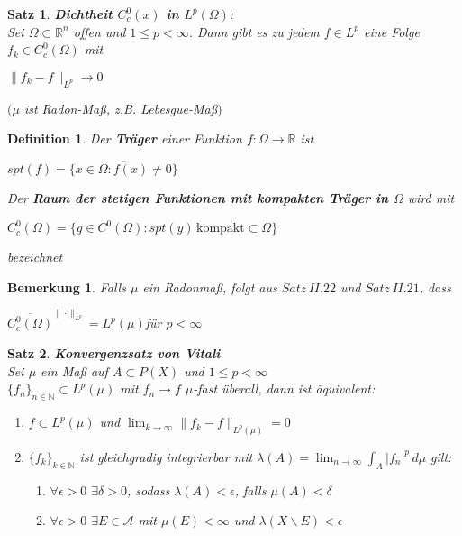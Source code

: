 \documentclass[11pt]{memoir}
\theoremstyle{changebreak}
\newtheorem{Definition}{Definition}[chapter]
\newtheorem{Bemerkung}{Bemerkung}[chapter]
\newtheorem{Satz}{Satz}[chapter]
\begin{document}
\begin{Satz}
\emph{\textbf{Dichtheit $C^0_c (x)$ in $L^p(\Omega)$}}: \\
Sei $\Omega \subset \mathbb R^n$ offen und $1 \leq p < \infty$. Dann gibt es zu jedem $f \in L^p$ eine Folge $f_k \in C^0_c (\Omega)$ mit 
\begin{center}
	$\|f_k - f\|_{L^p} \rightarrow 0$
\end{center}
$(\mu$ ist Radon-Maß, z.B. Lebesgue-Maß$)$
\end{Satz}

\begin{Definition}
Der \textbf{Träger} einer Funktion $f: \Omega \rightarrow \mathbb R$ ist 
\begin{center}
	$spt(f) = \overline{\{x \in \Omega: f(x) \ne 0\}} $
\end{center}
Der \textbf{Raum der stetigen Funktionen mit kompakten Träger in $\Omega$} wird mit
\begin{center}
	$C_c^0 (\Omega) = \{g \in C^0(\Omega): spt(y) \, \text{kompakt} \subset \Omega\}$
\end{center}
bezeichnet
\end{Definition}


\begin{Bemerkung}
Falls $\mu$ ein Radonmaß, folgt aus $Satz \, II.22$ und $Satz \,  II.21$, dass 
\begin{center}
	$\overline{C^0_c (\Omega)}^{\|\cdotp\|_{L^p}} = L^p (\mu)$\quad  für $p < \infty$
\end{center}
\end{Bemerkung}

\begin{Satz}
\emph{\textbf{Konvergenzsatz von Vitali}} \\
Sei $\mu$ ein Maß auf $A \subset P(X)$ und $1 \leq p < \infty$ \\
$\{f_n\}_{n \in \mathbb N} \subset L^p(\mu)$ mit $f_n \rightarrow f$ $\mu$-fast überall, dann ist äquivalent:
\begin{enumerate}
	\item $f \subset L^p(\mu)$ und $\lim_{k \rightarrow \infty} \|f_k -f \|_{L^p (\mu)} = 0$
	\item $\{f_k\}_{k \in \mathbb N}$ ist gleichgradig integrierbar mit $\lambda(A) = \lim_{n \rightarrow \infty} \int_A |f_n|^p \, d\mu$ gilt:
	\begin{enumerate}
		\item $\forall \epsilon > 0$ $\exists \delta > 0$, sodass $\lambda(A) < \epsilon$, falls $\mu(A) < \delta$
		\item $\forall \epsilon > 0$ $\exists E \in \mathscr A$ mit $\mu(E) < \infty$ und $\lambda(X \backslash E) < \epsilon$
	\end{enumerate}
\end{enumerate}

\end{Satz}
\end{document}
